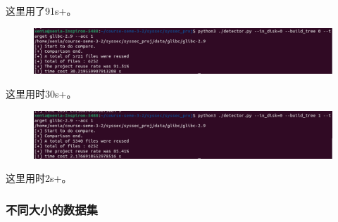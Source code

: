 \documentclass{cjc}
\begin{document}
   这里用了91s+。


\begin{figure}[htb]
  \centering
  \includegraphics[width=\linewidth]{pics/image-20220622221549800.png}
\end{figure}

   这里用时30s+。

\begin{figure}[htb]
  \centering
  \includegraphics[width=\linewidth]{pics/image-20220622221526098.png}
\end{figure}

   这里用时2s+。

   

\subsubsection{ 不同大小的数据集}
   

   
















\nocite{*}




\makebiographies
\end{document}
